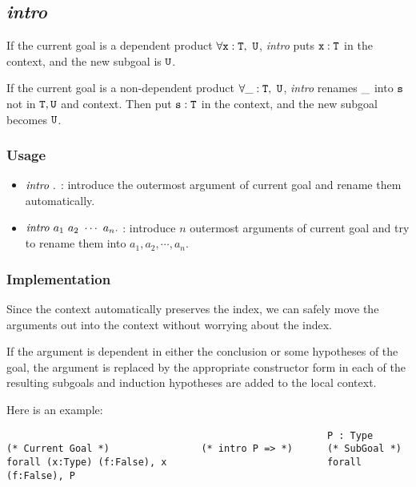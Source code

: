 \subsection{\it intro}

If the current goal is a dependent product $\tt \forall x:T,\ U$, \textit{intro} puts 
$\tt x:T$ in the context, and the new subgoal is $\tt U$.\par
If the current goal is a non-dependent product $\tt \forall \_:T,\ U$, \textit{intro} renames
$\tt \_$ into $\tt s$ not in $\tt T,U$ and context. Then put $\tt s:T$ in the context, 
and the new subgoal becomes $\tt U$.

\subsubsection*{Usage}
\begin{itemize}
\item ${\it intro}\ .$ : introduce the outermost argument of current goal and rename them automatically.
\item ${\it intro}\ a_1\ a_2\ \cdots\ a_n.$ : introduce $n$ outermost arguments of current goal and
try to rename them into $a_1,a_2,\cdots,a_n$.
\end{itemize}

\subsubsection*{Implementation}
Since the context automatically preserves the index, we
can safely move the arguments out into the context without worrying about the index.

If the argument is dependent in either the conclusion or some hypotheses of the goal,
the argument is replaced by the appropriate constructor form in each of the resulting subgoals
and induction hypotheses are added to the local context.

Here is an example:
\begin{center}
\begin{minipage}{\textwidth}
\begin{verbatim}
                                                        P : Type
(* Current Goal *)                (* intro P => *)      (* SubGoal *) 
forall (x:Type) (f:False), x                            forall (f:False), P
\end{verbatim}
\end{minipage}
\end{center}

